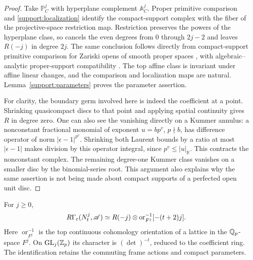 \begin{proof}
Take $\mathbb P_C^j$ with hyperplane complement
$\mathbb A_C^j$.  Proper primitive comparison
\cite[Theorem~5.1]{ScholzeHodge} and
\eqref{support:localization} identify the compact-support complex
with the fiber of the projective-space restriction map.  Restriction
preserves the powers of the hyperplane class, so cancels the even
degrees from $0$ through $2j-2$ and leaves $R(-j)$ in degree $2j$.
The same conclusion follows directly from compact-support primitive
comparison for Zariski opens of smooth proper spaces
\cite[Corollary~5.3.2 and its proof]{PignonYwanne}, with
algebraic--analytic proper-support compatibility
\cite[Proposition~3.16]{BhattHansen}.
The top affine class is invariant under affine linear changes,
and the comparison and localization maps are natural.
Lemma~\ref{support:parameters} proves the parameter assertion.

For clarity, the boundary germ involved here is indeed the
coefficient at a point.  Shrinking quasicompact discs to that point
and applying spatial continuity gives $R$ in degree zero.  One can
also see the vanishing directly on a Kummer annulus: a nonconstant
fractional monomial of exponent $u=bp^v$, $p\nmid b$, has
difference operator of norm $|\epsilon-1|^{p^v}$.  Shrinking both
Laurent bounds by a ratio at most $|\epsilon-1|$ makes division by
this operator integral, since $p^v\leq|u|_{\mathbb R}$.  This
contracts the nonconstant complex.  The remaining degree-one
Kummer class vanishes on a smaller disc by the binomial-series
root.  This argument also explains why the same assertion is not
being made about compact supports of a perfected open unit disc.
\end{proof}

\begin{lemma}\label{support:translation-quotient}
For $j\geq0$,
\begin{equation}\label{support:ambient-cohomology}
 R\Gamma_c(N_t^j,\mathscr A)
 \simeq R(-j)\otimes\operatorname{or}_{F^j}^{-1}[-(t+2)j].
\end{equation}
Here $\operatorname{or}_{F^j}^{-1}$ is the top continuous
cohomology orientation of a lattice in the $\mathbb Q_p$-space $F^j$.
On $\operatorname{GL}_j(\mathbb Z_p)$ its character is $(\det)^{-t}$, reduced to the
coefficient ring.  The identification retains the commuting frame
actions and compact parameters.
\end{lemma}

